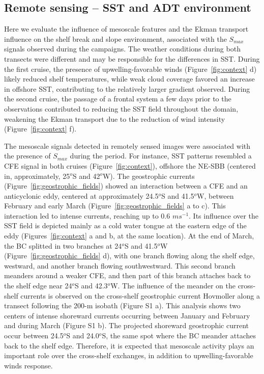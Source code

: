 \documentclass[draft]{agujournal2019}
\begin{document}
\subsection{Remote sensing -- SST and ADT environment}
\label{subsec:remote_sensing}

Here we evaluate the influence of mesoscale features and the Ekman transport influence on the shelf break and slope environment, associated with the \textit{$S_{max}$} signals observed during the campaigns. The weather conditions during both transects were different and may be responsible for the differences in SST. During the first cruise, the presence of upwelling-favorable winds (Figure~\ref{fig:context} d) likely reduced shelf temperatures, while weak cloud coverage favored an increase in offshore SST, contributing to the relatively larger gradient observed. During the second cruise, the passage of a frontal system a few days prior to the observations contributed to reducing the SST field throughout the domain, weakening the Ekman transport due to the reduction of wind intensity (Figure~\ref{fig:context} f).

The mesoscale signals detected in remotely sensed images were associated with the presence of \textit{$S_{max}$} during the period. For instance, SST patterns resembled a CFE signal in both cruises (Figure~\ref{fig:context}), offshore the NE-SBB (centered in, approximately, 25$^o$S and 42$^o$W). The geostrophic currents (Figure~\ref{fig:geostrophic_fields}) showed an interaction between a CFE and an anticyclonic eddy, centered at approximately 24.5$^o$S and 41.5$^o$W, between February and early March (Figure~\ref{fig:geostrophic_fields} a to c). This interaction led to intense currents, reaching up to 0.6 $m s^{-1}$. Its influence over the SST field is depicted mainly as a cold water tongue at the eastern edge of the eddy (Figures~\ref{fig:context} a and b, at the same location). At the end of March, the BC splitted in two branches at 24$^o$S and 41.5$^o$W (Figure~\ref{fig:geostrophic_fields} d), with one branch flowing along the shelf edge, westward, and another branch flowing southwestward. This second branch meanders around a weaker CFE, and then part of this branch attaches back to the shelf edge near 24$^o$S and 42.3$^o$W. The influence of the meander on the cross-shelf currents is observed on the cross-shelf geostrophic current Hovmoller along a transect following the 200-m isobath (Figure S1 a). This analysis shows two centers of intense shoreward currents occurring between January and February and during March (Figure S1 b). The projected shoreward geostrophic current occur between 24.5$^o$S and 24.0$^o$S, the same spot where the BC meander attaches back to the shelf edge. Therefore, it is expected that mesoscale activity plays an important role over the cross-shelf exchanges, in addition to upwelling-favorable winds response.
\end{document}
